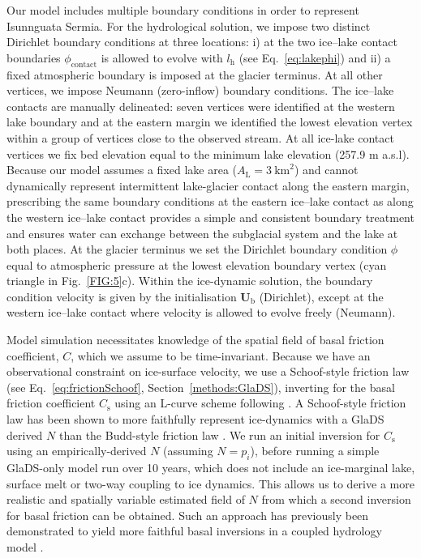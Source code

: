 \documentclass[tc, manuscript]{copernicus}
\begin{document}
Our model includes multiple boundary conditions in order to represent Isunnguata Sermia. For the hydrological solution, we impose two distinct Dirichlet boundary conditions at three locations: i) at the two ice--lake contact boundaries $\phi_{\mathrm{contact}}$ is allowed to evolve with $l_{\mathrm{h}}$ (see Eq.~\ref{eq:lakephi}) and ii) a fixed atmospheric boundary is imposed at the glacier terminus. At all other vertices, we impose Neumann (zero-inflow) boundary conditions. The ice--lake contacts are manually delineated: seven vertices were identified at the western lake boundary and at the eastern margin we identified the lowest elevation vertex within a group of vertices close to the observed stream. At all ice-lake contact vertices we fix bed elevation equal to the minimum lake elevation (257.9 m a.s.l). Because our model assumes a fixed lake area ($A_{\mathrm{L}}=3\ \mathrm{km}^2$) and cannot dynamically represent intermittent lake-glacier contact along the eastern margin, prescribing the same boundary conditions at the eastern ice--lake contact as along the western ice--lake contact provides a simple and consistent boundary treatment and ensures water can exchange between the subglacial system and the lake at both places. At the glacier terminus we set the Dirichlet boundary condition $\phi$ equal to atmospheric pressure at the lowest elevation boundary vertex (cyan triangle in Fig.~\ref{FIG:5}c). Within the ice-dynamic solution, the boundary condition velocity is given by the initialisation $\mathbf{U}_{\mathrm{b}}$ (Dirichlet), except at the western ice--lake contact where velocity is allowed to evolve freely (Neumann). 

Model simulation necessitates knowledge of the spatial field of basal friction coefficient, $C$, which we assume to be time-invariant. Because we have an observational constraint on ice-surface velocity, we use a Schoof-style friction law (see Eq.~\ref{eq:frictionSchoof}, Section~\ref{methods:GlaDS}), inverting for the basal friction coefficient $C_{\mathrm{s}}$ using an L-curve scheme following \citet{wolovick2023regularization}. A Schoof-style friction law has been shown to more faithfully represent ice-dynamics with a GlaDS derived $N$ than the Budd-style friction law \citep{mcarthur2023basal}. We run an initial inversion for $C_{\mathrm{s}}$ using an empirically-derived $N$ (assuming $N=p_{i}$), before running a simple GlaDS-only model run over 10 years, which does not include an ice-marginal lake, surface melt or two-way coupling to ice dynamics. This allows us to derive a more realistic and spatially variable estimated field of $N$ from which a second inversion for basal friction can be obtained. Such an approach has previously been demonstrated to yield more faithful basal inversions in a coupled hydrology model \citep{ehrenfeucht2023seasonal,mcarthur2023basal}. 
\end{document}
